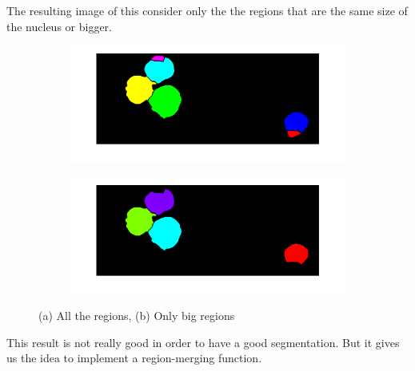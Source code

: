 The resulting image of this consider only the the regions that are the same size of the nucleus or bigger.
\begin{figure}
	\centering
	\begin{subfigure}[b]{0.6\textwidth}
        \includegraphics[width=\textwidth]{img/celluleConCito.png}
        \caption{ }
        \label{fig:alltheregions}
    \end{subfigure}
    \begin{subfigure}[b]{0.6\textwidth}
		\includegraphics[width=\textwidth]{img/conteggioNuclei(noWatersheed).png}
		\caption{ }
		\label{fig:onlybigregions}
	\end{subfigure}
	\caption{(a) All the regions, (b) Only big regions}
	\label{fig:counting}
\end{figure}

\bigskip

This result is not really good in order to have a good segmentation. But it gives us the idea to implement a region-merging function. 
